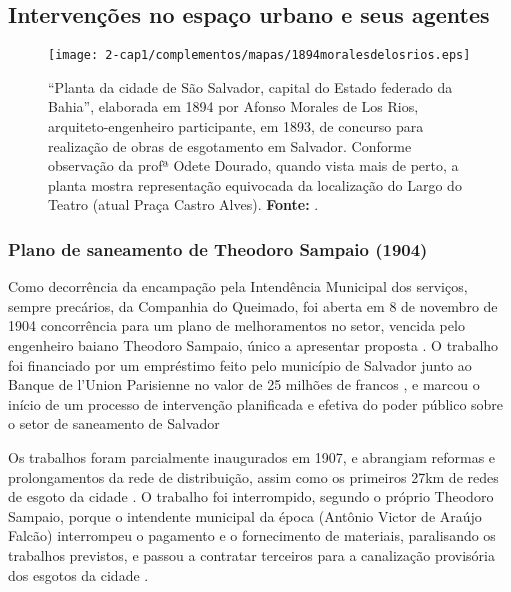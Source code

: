 


\subsection{Intervenções no espaço urbano e seus agentes}\label{subsec:1.4.3}

\begin{figure}[!htp]
\centering
\texttt{[image: 2-cap1/complementos/mapas/1894moralesdelosrios.eps]} 
\caption{``Planta da cidade de São Salvador, capital do Estado federado da Bahia'', elaborada em 1894 por Afonso Morales de Los Rios, arquiteto-engenheiro participante, em 1893, de concurso para realização de obras de esgotamento em Salvador. Conforme observação da profª Odete Dourado, quando vista mais de perto, a planta mostra representação equivocada da localização do Largo do Teatro (atual Praça Castro Alves). \textbf{Fonte:} .}
\end{figure}

\subsubsection{Plano de saneamento de Theodoro Sampaio (1904)}\label{subsubsec:1.4.3.1}

Como decorrência da encampação pela Intendência Municipal dos serviços, sempre precários, da Companhia do Queimado, foi aberta em 8 de novembro de 1904 concorrência para um plano de melhoramentos no setor, vencida pelo engenheiro baiano Theodoro Sampaio, único a apresentar proposta \cite[150]{gordilhobarbosa_eau_2004}. O trabalho foi financiado por um empréstimo feito pelo município de Salvador junto ao Banque de l'Union Parisienne no valor de 25 milhões de francos \cite[p.~150]{gordilhobarbosa_eau_2004}, e marcou o início de um processo de intervenção planificada e efetiva do poder público sobre o setor de saneamento de Salvador \cite[p.~150]{gordilhobarbosa_eau_2004} 

Os trabalhos foram parcialmente inaugurados em 1907, e abrangiam reformas e prolongamentos da rede de distribuição, assim como os primeiros 27km de redes de esgoto da cidade \cite[p.~151]{gordilhobarbosa_eau_2004}. O trabalho foi interrompido, segundo o próprio Theodoro Sampaio, porque o intendente municipal da época (Antônio Victor de Araújo Falcão) interrompeu o pagamento e o fornecimento de materiais, paralisando os trabalhos previstos, e passou a contratar terceiros para a canalização provisória dos esgotos da cidade \cite[p.~152]{gordilhobarbosa_eau_2004}.

